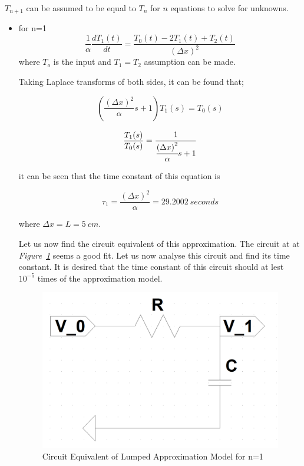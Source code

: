 \documentclass[a4paper,12pt]{article}
\begin{document}
\begin{enumerate}
			$T_{n+1}$ can be assumed to be equal to $T_n$ for $n$ equations to solve for unknowns.
		
		
		\begin{itemize}
			\item for n=1
				$$ \frac{1}{\alpha}\frac{dT_1(t)}{dt}=\frac{T_0(t)-2T_1(t)+T_2(t)}{{(\Delta x)}^2}	$$		
				where $T_o$ is the input and $T_1=T_2$ assumption can be made.
				
				Taking Laplace transforms of both sides, it can be found that;
				
				$$ \left( \frac{{(\Delta x)}^2}{\alpha} s+1\right) T_1(s)=T_0(s)$$	
				
				$$ \frac{T_1(s)}{T_0(s)}=\cfrac{1}{\cfrac{{(\Delta x)}^2}{\alpha} s+1}$$
				
				it can be seen that the time constant of this equation is 
				
				$$ \tau_1=\frac{{(\Delta x)}^2}{\alpha}= 29.2002\ seconds$$
				
				where $\Delta x=L=5\ cm$.
				
				Let us now find the circuit equivalent of this approximation. The circuit at at \textit{Figure~\ref{fig:pre2a}} seems a good fit. Let us now analyse this circuit and find its time constant. It is desired that the time constant of this circuit should at lest $10^{-5}$ times of the approximation model.
				
				\begin{figure}[H]
					\center
					\setlength{\unitlength}{\textwidth} 
					\includegraphics[width=0.6\unitlength]{images/pre2a}
					\caption{\label{fig:pre2a} Circuit Equivalent of Lumped Approximation Model for n=1}
				\end{figure}
				

\end{itemize}
\end{enumerate}
\end{document}
